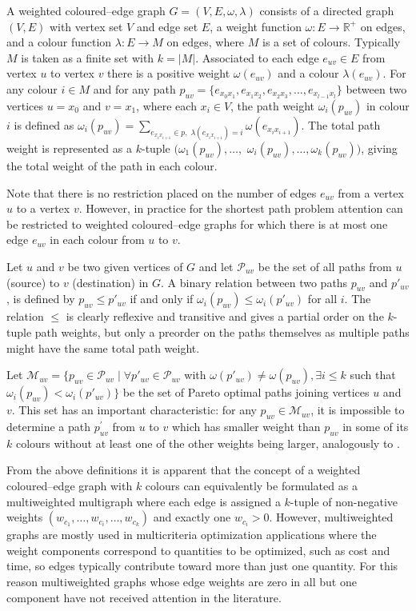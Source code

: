 \documentclass[preprint,authoryear,12pt]{elsarticle}
\begin{document}
A weighted coloured--edge graph $G=(V,E,\omega,\lambda)$ consists of a
directed graph $(V,E)$ with vertex set $V$ and edge set $E$,
a weight function $\omega\colon E\rightarrow\mathbb{R^+}$ on
edges, and a colour function $\lambda\colon E\rightarrow M$ on edges,
where $M$ is a set of colours.
Typically $M$ is taken as a finite set with $k=|M|$.
Associated to each edge $e_{uv} \in  E$ from vertex $u$ to
vertex $v$ there is a positive weight $\omega(e_{uv})$ and a
colour $\lambda (e_{uv})$. For any colour $i \in M$ and for
any path $p_{uv} = \{e_{x_0x_1},e_{x_1x_2},e_{x_2x_3},\ldots,e_{x_{l-1}x_l}\}$
between two vertices $u=x_0$ and $v=x_1$, where each $x_i \in V$, the path weight $\omega_i
(p_{uv})$ in colour $i$ is defined as
$\omega_i(p_{uv}) = \textstyle \sum_{e_{x_ix_{i+1}} \in p, \; \lambda(e_{x_ix_{i+1}})=i} \omega(e_{x_ix_{i+1}})$.
The total path weight is represented as a $k$-tuple
$(\omega_1(p_{uv}),\ldots,$ $\omega_i(p_{uv}),\ldots,\omega_k(p_{uv}))$,
giving the total weight of the path in each colour.

Note that there is no restriction placed on the number of edges
$e_{uv}$ from a vertex $u$ to a vertex $v$. However, in practice
for the shortest path problem attention can be restricted to
weighted coloured--edge graphs for which there is at most one edge
$e_{uv}$ in each colour from $u$ to $v$.

Let $u$ and $v$ be two given vertices of $G$ and let
$\mathscr{P}_{uv}$ be the set of all paths from $u$ (source) to
$v$ (destination) in $G$. A binary relation between two paths $p_{uv}$
and $p'_{uv}$, is defined by $p_{uv} \le p'_{uv}$ if and only if $\omega_i (p_{uv})
\le \omega_i (p'_{uv})$ for all $i$. The relation $\le$ is clearly
reflexive and transitive and gives a partial order on the
$k$-tuple path weights,
but only a preorder on the paths themselves as multiple paths might have
the same total path weight.

Let $\mathcal{M}_{uv} = \{p_{uv} \in \mathscr{P}_{uv} \mid \forall p'_{uv}
\in \mathscr{P}_{uv}$ with $\omega(p'_{uv}) \ne \omega(p_{uv}), \exists i
\le k$ such that $\omega_i (p_{uv}) < \omega_i (p'_{uv})\}$ be the set of
Pareto optimal paths joining vertices $u$ and $v$. This set has an
important characteristic: for any $p_{uv} \in \mathcal{M}_{uv}$, it is
impossible to determine a path $p^\prime_{uv}$ from $u$ to $v$ which has
smaller weight than $p_{uv}$ in some of its $k$ colours without at least
one of the other weights being larger, analogously to \cite{List16}.

From the above definitions it is apparent that the concept of
a weighted coloured--edge graph with $k$ colours can equivalently be formulated
as a multiweighted multigraph where each edge is assigned a $k$-tuple of non-negative
weights $\left(w_{c_1},\dots,w_{c_i},\dots,w_{c_k}\right)$ and exactly one $w_{c_i}>0$.
However, multiweighted graphs are mostly used in multicriteria optimization applications
where the weight components correspond to quantities to be optimized, such as cost and time,
so edges typically contribute toward more than just one quantity.
For this reason multiweighted graphs whose edge weights are zero in all but one component
have not received attention in the literature.
\end{document}
